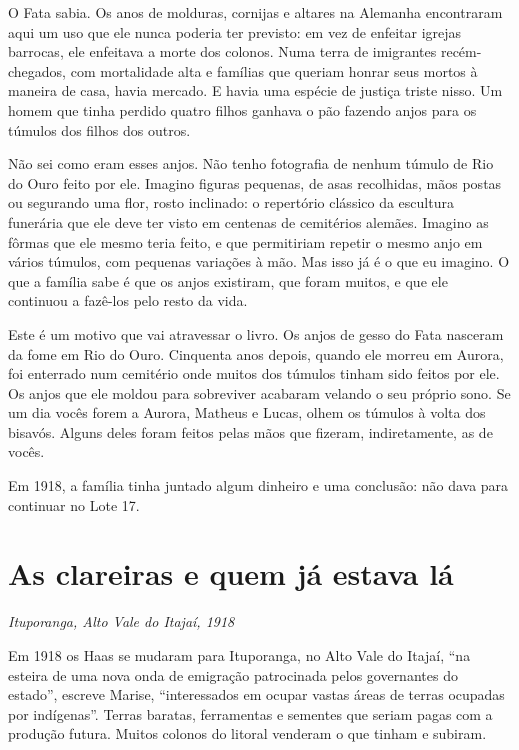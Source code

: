 \documentclass[
  brazilian,
  11pt,
  openany]{book}
\begin{document}
O Fata sabia. Os anos de molduras, cornijas e altares na Alemanha
encontraram aqui um uso que ele nunca poderia ter previsto: em vez de
enfeitar igrejas barrocas, ele enfeitava a morte dos colonos. Numa terra
de imigrantes recém-chegados, com mortalidade alta e famílias que
queriam honrar seus mortos à maneira de casa, havia mercado. E havia uma
espécie de justiça triste nisso. Um homem que tinha perdido quatro
filhos ganhava o pão fazendo anjos para os túmulos dos filhos dos
outros.

Não sei como eram esses anjos. Não tenho fotografia de nenhum túmulo de
Rio do Ouro feito por ele. Imagino figuras pequenas, de asas recolhidas,
mãos postas ou segurando uma flor, rosto inclinado: o repertório
clássico da escultura funerária que ele deve ter visto em centenas de
cemitérios alemães. Imagino as fôrmas que ele mesmo teria feito, e que
permitiriam repetir o mesmo anjo em vários túmulos, com pequenas
variações à mão. Mas isso já é o que eu imagino. O que a família sabe é
que os anjos existiram, que foram muitos, e que ele continuou a fazê-los
pelo resto da vida.

Este é um motivo que vai atravessar o livro. Os anjos de gesso do Fata
nasceram da fome em Rio do Ouro. Cinquenta anos depois, quando ele
morreu em Aurora, foi enterrado num cemitério onde muitos dos túmulos
tinham sido feitos por ele. Os anjos que ele moldou para sobreviver
acabaram velando o seu próprio sono. Se um dia vocês forem a Aurora,
Matheus e Lucas, olhem os túmulos à volta dos bisavós. Alguns deles
foram feitos pelas mãos que fizeram, indiretamente, as de vocês.

Em 1918, a família tinha juntado algum dinheiro e uma conclusão: não
dava para continuar no Lote 17.

\section{As clareiras e quem já estava
lá}\label{as-clareiras-e-quem-juxe1-estava-luxe1}

\emph{Ituporanga, Alto Vale do Itajaí, 1918}

Em 1918 os Haas se mudaram para Ituporanga, no Alto Vale do Itajaí, ``na
esteira de uma nova onda de emigração patrocinada pelos governantes do
estado'', escreve Marise, ``interessados em ocupar vastas áreas de
terras ocupadas por indígenas''. Terras baratas, ferramentas e sementes
que seriam pagas com a produção futura. Muitos colonos do litoral
venderam o que tinham e subiram.
\end{document}
